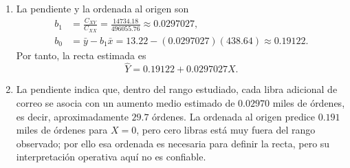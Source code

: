 \begin{enumerate}
    \item[\textbf{d)}] La pendiente y la ordenada al origen son
    \begin{align*}
    b_1&=\frac{C_{XY}}{C_{XX}}=\frac{14734.18}{496055.76}\approx0.0297027,\\
    b_0&=\bar y-b_1\bar x
    =13.22-(0.0297027)(438.64)\approx0.19122.
    \end{align*}
    Por tanto, la recta estimada es
    \[
    \boxed{\widehat Y=0.19122+0.0297027X}.
    \]

    \item[\textbf{e)}] La pendiente indica que, dentro del rango estudiado, cada libra adicional de correo se asocia con un aumento medio estimado de $0.02970$ miles de órdenes, es decir, aproximadamente $29.7$ órdenes. La ordenada al origen predice $0.191$ miles de órdenes para $X=0$, pero cero libras está muy fuera del rango observado; por ello esa ordenada es necesaria para definir la recta, pero su interpretación operativa aquí no es confiable.


\end{enumerate}
